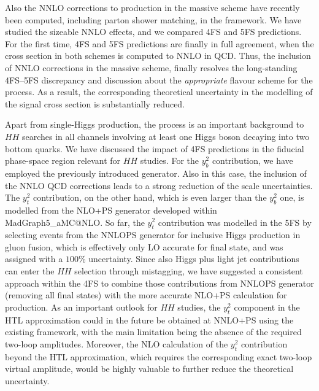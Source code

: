 \documentclass[11pt,a4paper]{article}
\begin{document}
Also the NNLO corrections to \bbH{} production in the massive scheme 
have recently been computed, including parton shower matching, in the \minnlo{} 
framework. We have studied the sizeable NNLO effects, and we compared 4FS 
and 5FS \minnlo{} predictions. For the first time, 4FS and 5FS predictions are finally
in full agreement, when the cross section in both schemes is computed to NNLO
in QCD. Thus, the inclusion of NNLO corrections in the massive scheme, finally
resolves the long-standing 4FS--5FS discrepancy and 
discussion about the {\it appropriate} flavour scheme for the \bbH{} process.
As a result, the corresponding theoretical uncertainty in the modelling of the 
\bbH{} signal cross section is substantially reduced.

Apart from single-Higgs production, the \bbH{} process is an important background to
$HH$ searches in all channels involving at least one Higgs boson decaying into two
bottom quarks. 
We have discussed the impact of 4FS predictions in the fiducial phase-space region
relevant for $HH$ studies. For the $y_b^2$ contribution, we have employed the
previously introduced \minnlo{} generator. Also in this case, the inclusion of the NNLO
QCD corrections leads to a strong reduction of the scale uncertainties.
The $y_t^2$ contribution, on the other hand,
which is even larger than the $y_b^2$ one, is modelled from the
NLO+PS generator developed within {\sc MadGraph5\_aMC@NLO}. 
So far, the $y_t^2$ contribution was modelled in the 5FS by selecting events 
from the \textsc{NNLOPS} generator for inclusive Higgs production in 
gluon fusion, which is effectively only LO accurate for \bbH{} final state, and
was assigned with a $100$\% uncertainty.
Since also Higgs plus light jet contributions can enter the $HH$ selection 
through mistagging, we have suggested a consistent approach within the 4FS
to combine those contributions from NNLOPS generator (removing all \bbH{} final states)
with the more accurate NLO+PS calculation for \bbH{} production.
As an important outlook for $HH$ studies, the $y_t^2$ \bbH{} component in the HTL approximation could in the future be obtained at NNLO+PS using the existing \minnlo{} framework, with the main limitation being the absence of the required two-loop amplitudes. Moreover, the NLO calculation of the $y_t^2$ \bbH{} contribution beyond the HTL approximation,
which requires the corresponding exact two-loop virtual amplitude, would be highly valuable to further reduce the theoretical uncertainty.
\end{document}
